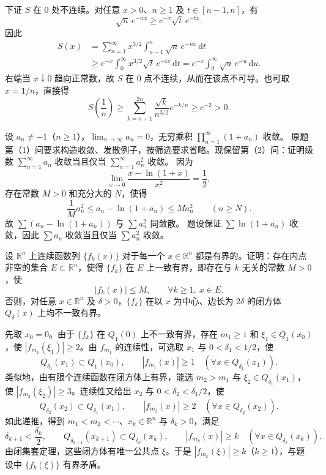 下证 $S$ 在 $0$ 处不连续。对任意 $x>0$、$n\geq1$ 及 $t\in[n-1,n]$，有
\[
\sqrt n\,e^{-nx}\geq e^{-x}\sqrt t\,e^{-tx}.
\]
因此
\[
\begin{aligned}
S(x)
&=\sum_{n=1}^{\infty}x^{3/2}\int_{n-1}^{n}\sqrt n\,e^{-nx}\,\mathrm dt\\
&\geq e^{-x}\int_0^{\infty}x^{3/2}\sqrt t\,e^{-tx}\,\mathrm dt
=e^{-x}\int_0^{\infty}\sqrt u\,e^{-u}\,\mathrm du.
\end{aligned}
\]
右端当 $x\downarrow0$ 趋向正常数，故 $S$ 在 $0$ 点不连续，从而在该点不可导。也可取 $x=1/n$，直接得
\[
S\!\left(\frac1n\right)
\geq\sum_{k=n+1}^{2n}\frac{\sqrt k}{n^{3/2}}e^{-k/n}
\geq e^{-2}>0.
\]

设 $a_n\ne-1$（$n\ge1$），$\lim_{n\to\infty}a_n=0$，无穷乘积
$\prod_{n=1}^{\infty}(1+a_n)$ 收敛。
原题第（1）问要求构造收敛、发散例子，按筛选要求省略。现保留第（2）问：证明级数 $\sum_{n=1}^{\infty}a_n$ 收敛当且仅当 $\sum_{n=1}^{\infty}a_n^2$ 收敛。
\pf 因为
\[
\lim_{x\to0}\frac{x-\ln(1+x)}{x^2}=\frac12,
\]
存在常数 $M>0$ 和充分大的 $N$，使得
\[
\frac1M a_n^2\le a_n-\ln(1+a_n)\le Ma_n^2\qquad(n\ge N).
\]
故 $\sum(a_n-\ln(1+a_n))$ 与 $\sum a_n^2$ 同敛散。
题设保证 $\sum\ln(1+a_n)$ 收敛，因此 $\sum a_n$ 收敛当且仅当 $\sum a_n^2$ 收敛。

设 $\mathbb R^n$ 上连续函数列 $\{f_k(x)\}$ 对于每一个 $x\in\mathbb R^n$ 都是有界的。证明：存在内点非空的集合 $E\subset\mathbb R^n$，使得 $\{f_k\}$ 在 $E$ 上一致有界，即存在与 $k$ 无关的常数 $M>0$，使
\[
|f_k(x)|\le M,\qquad \forall k\ge1,\ x\in E.
\]
\pf 否则，对任意 $x\in\mathbb R^n$ 及 $\delta>0$，$\{f_k\}$ 在以 $x$ 为中心、边长为 $2\delta$ 的闭方体 $Q_\delta(x)$ 上均不一致有界。

先取 $x_0=0$。由于 $\{f_k\}$ 在 $Q_1(0)$ 上不一致有界，存在 $m_1\ge1$ 和 $\xi_1\in Q_1(x_0)$，使 $|f_{m_1}(\xi_1)|\ge2$。由 $f_{m_1}$ 的连续性，可选取 $x_1$ 与 $0<\delta_1<1/2$，使
\[
Q_{\delta_1}(x_1)\subset Q_1(x_0),\qquad
|f_{m_1}(x)|\ge1\quad(\forall x\in Q_{\delta_1}(x_1)).
\]
类似地，由有限个连续函数在闭方体上有界，能选 $m_2>m_1$ 与 $\xi_2\in Q_{\delta_1}(x_1)$，使 $|f_{m_2}(\xi_2)|\ge3$。连续性又给出 $x_2$ 与 $0<\delta_2<\delta_1/2$，使
\[
Q_{\delta_2}(x_2)\subset Q_{\delta_1}(x_1),\qquad
|f_{m_2}(x)|\ge2\quad(\forall x\in Q_{\delta_2}(x_2)).
\]
如此递推，得到 $m_1<m_2<\cdots$、$x_k\in\mathbb R^n$ 与 $\delta_k>0$，满足
\[
\delta_{k+1}<\frac{\delta_k}{2},\qquad
Q_{\delta_{k+1}}(x_{k+1})\subset Q_{\delta_k}(x_k),\qquad
|f_{m_k}(x)|\ge k\quad(\forall x\in Q_{\delta_k}(x_k)).
\]
由闭集套定理，这些闭方体有唯一公共点 $\xi$。于是
$|f_{m_k}(\xi)|\ge k$（$k\ge1$），与题设中 $\{f_k(\xi)\}$ 有界矛盾。

